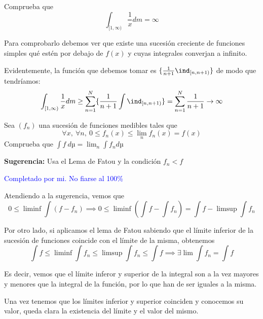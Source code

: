 \begin{problem}[5]

Comprueba que
\[\int_{[1,\infty)} \frac{1}{x}dm = \infty\]

\solution

Para comprobarlo debemos ver que existe una sucesión creciente de funciones simples qué estén por debajo de $f(x)$ y cuyas integrales converjan a infinito.

Evidentemente, la función que debemos tomar es $\{\frac{1}{n+1}\ind_{[n,n+1)}\}$ de modo que tendríamos:
\[\int_{[1,\infty)} \frac{1}{x}dm \geq \sum_{n=1}^N \{\frac{1}{n+1}\int\ind_{[n,n+1)}\} =  \sum_{n=1}^N \frac{1}{n+1}\rightarrow\infty\]

\end{problem}

\begin{problem}[6]

Sea $(f_n)$ una sucesión de funciones medibles tales que
\[\forall x, \ \forall n, \ 0 \leq f_n(x) \leq \lim_n f_n(x)=f(x)\]
Comprueba que
$\int f\ dµ = \lim_n \int f_n dµ$

\textbf{Sugerencia:} Usa el Lema de Fatou y la condición $f_n < f$

\solution
\textcolor{blue}{Completado por mi. No fiarse al 100\%}

Atendiendo a la sugerencia, vemos que
\[0 \leq \liminf \int (f-f_n) \implies 0 \leq \liminf(\int f - \int f_n) = \int f - \limsup \int f_n\]

Por otro lado, si aplicamos el lema de Fatou sabiendo que el límite inferior de la sucesión de funciones coincide con el límite de la misma, obtenemos
\[\int f \leq \liminf \int f_n \leq \limsup \int f_n \leq \int f \implies \exists \lim \int f_n = \int f \]

Es decir, vemos que el límite inferor y superior de la integral son a la vez mayores y menores que la integral de la función, por lo que han de ser iguales a la misma.

Una vez tenemos que los límites inferior y superior coinciden y conocemos su valor, queda clara la existencia del límite y el valor del mismo.
\end{problem}

